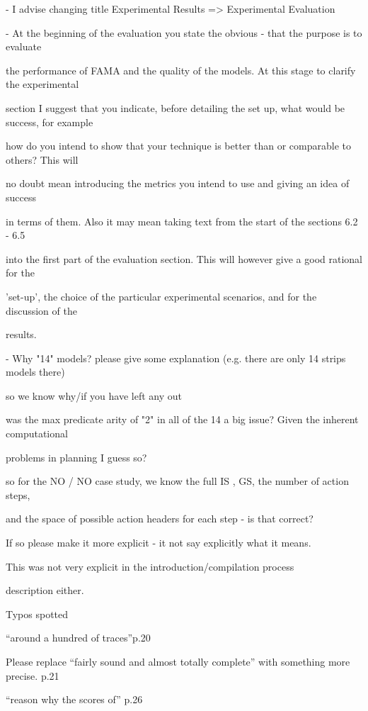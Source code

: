 \documentclass{article}
\begin{document}
\begin{mdframed}[hidealllines=true,backgroundcolor=gray!20]
  - I advise changing title Experimental Results => Experimental Evaluation
\end{mdframed}

\begin{mdframed}[hidealllines=true,backgroundcolor=gray!20]
  - At the beginning of the evaluation you state the obvious - that the purpose is to evaluate

the performance of FAMA and the quality of the models. At this stage to clarify the experimental

section I suggest that you indicate, before detailing the set up, what would be success, for example

how do you intend to show that your technique is better than or comparable to others? This will

no doubt mean introducing the metrics you intend to use and giving an idea of success

in terms of them. Also it may mean taking text from the start of the sections 6.2 - 6.5

 into the first part of the evaluation section. This will however give a good rational for the

'set-up’, the choice of the particular experimental scenarios, and for the discussion of the

results.
\end{mdframed}

\begin{mdframed}[hidealllines=true,backgroundcolor=gray!20]
  - Why "14" models? please give some explanation (e.g. there are only 14 strips models there)

so we know why/if you have left any out
\end{mdframed}

\begin{mdframed}[hidealllines=true,backgroundcolor=gray!20]
  was the max predicate arity of "2" in all of the 14 a big issue? Given the inherent computational

problems in planning I guess so?
\end{mdframed}

\begin{mdframed}[hidealllines=true,backgroundcolor=gray!20]
  so for the NO / NO case study, we know the full IS , GS, the number of action steps,

and the space of possible action headers for each step - is that correct?

If so please make it more explicit - it not say explicitly what it means.

This was not very explicit in the introduction/compilation process

description either.
\end{mdframed}

\begin{mdframed}[hidealllines=true,backgroundcolor=gray!20]
  Typos spotted


“around a hundred of traces”p.20

Please replace “fairly sound and almost totally complete” with something more precise. p.21

“reason why the scores of” p.26
\end{mdframed}
\end{document}
